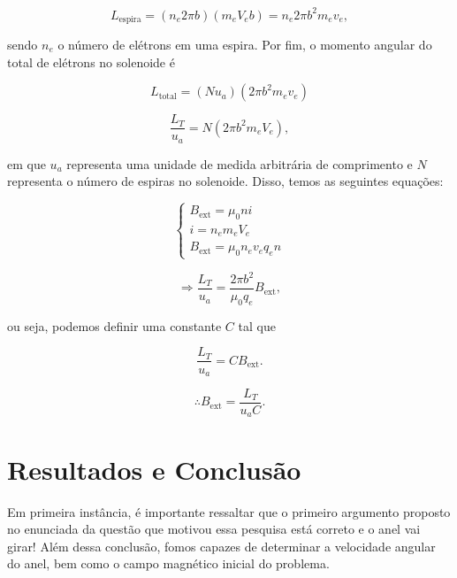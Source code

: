 \documentclass[
	article,
	11pt,
	oneside,
	a4paper,
	english,
	brazil,
	sumario=tradicional
	]{abntex2}
\begin{document}
\begin{equation}
    L_{\text{espira}} = (n_e 2\pi b)(m_e V_e b) = n_e  2\pi b^2 m_e v_e,
\end{equation}

sendo $n_e$ o número de elétrons em uma espira. Por fim, o momento angular do total de elétrons no solenoide é

\begin{equation}
    L_{\text{total}} = (N u_a)(2\pi b^2 m_e v_e)
\end{equation}

\begin{equation}
    \frac{L_T}{u_a} = N (2\pi b^2 m_e V_e),
\end{equation}

\noindent em que $u_a$ representa uma unidade de medida arbitrária de comprimento e $N$ representa o número de espiras no solenoide. Disso, temos as seguintes equações:

\begin{equation}
    \begin{cases}
	B_{\text{ext}} = \mu_0 n i\\
	i = n_e m_e V_e\\
	B_{\text{ext}} = \mu_0 n_e v_e q_e n
    \end{cases}
\end{equation}

\begin{equation}
    \Rightarrow \frac{L_T}{u_a} = \frac{2\pi b^2}{\mu_0 q_e} B_{\text{ext}},
\end{equation}

\noindent ou seja, podemos definir uma constante $C$ tal que

\begin{equation}
    \frac{L_T}{u_a} = C B_{\text{ext}}.
\end{equation}


\begin{equation}
    \therefore B_{\text{ext}} = \frac{L_T}{u_a C}.
\end{equation}

\section{Resultados e Conclusão}

Em primeira instância, é importante ressaltar que o primeiro argumento proposto no enunciada da questão que motivou essa pesquisa está correto e o anel vai girar! Além dessa conclusão, fomos capazes de determinar a velocidade angular do anel, bem como o campo magnético inicial do problema.

\nocite{leclair_2008}

\pagebreak
\onecolumn{
\postextual

}
\end{document}
